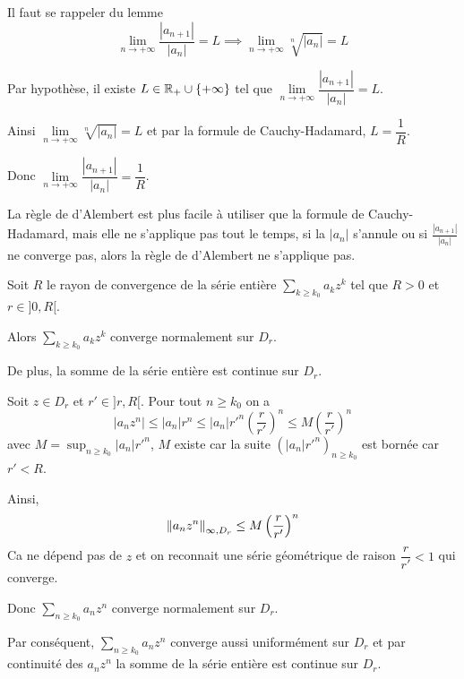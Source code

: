\documentclass[a4paper,12pt]{article}
\begin{document}
\begin{demonstration}
    Il faut se rappeler du lemme
    $$
    \lim_{n \to +\infty} \frac{|a_{n+1}|}{|a_n|} = L \implies \lim_{n \to +\infty} \sqrt[n]{|a_n|} = L
    $$

    Par hypothèse, il existe $L \in \mathbb{R}_+ \cup \{+\infty\}$ tel que $\lim\limits_{n \to +\infty} \dfrac{|a_{n+1}|}{|a_n|} = L$.

    Ainsi $\lim\limits_{n \to +\infty} \sqrt[n]{|a_n|} = L$ et par la formule de Cauchy-Hadamard, $L = \dfrac{1}{R}$.

    Donc $\lim\limits_{n \to +\infty} \dfrac{|a_{n+1}|}{|a_n|} = \dfrac{1}{R}$.
\end{demonstration}

\begin{remarque}
    La règle de d'Alembert est plus facile à utiliser que la formule de Cauchy-Hadamard,
    mais elle ne s'applique pas tout le temps, si la $|a_n|$ s'annule ou si $\frac{|a_{n+1}|}{|a_n|}$ ne converge pas,
    alors la règle de d'Alembert ne s'applique pas.    
\end{remarque}

\begin{proposition}{}{}
    Soit $R$ le rayon de convergence de la série entière $\sum\limits_{k \geq k_0} a_k z^k$ tel que $R > 0$ et $r \in ]0, R[$.

    \vspace{0.5cm}
    Alors $\sum\limits_{k \geq k_0} a_k z^k$ converge normalement sur $D_r$.

    De plus, la somme de la série entière est continue sur $D_r$.
\end{proposition}

\begin{demonstration}
    Soit $z \in D_r$ et $r' \in ]r, R[$.
    Pour tout $n \geq k_0$ on a
    $$
    |a_n z^n| \leq |a_n| r^n \leq |a_n| r'^n \left(\frac{r}{r'}\right)^n \leq M \left(\frac{r}{r'}\right)^n
    $$
    avec $M = \sup_{n \geq k_0} |a_n| r'^n$, $M$ existe car la suite $(|a_n| r'^n)_{n \geq k_0}$ est bornée car $r' < R$.
    
    Ainsi,
    $$
    \left\lVert a_n z^n\right\rVert_{\infty, D_r} \leq M \left(\frac{r}{r'}\right)^n
    $$
    Ca ne dépend pas de $z$ et on reconnait une série géométrique de raison $\dfrac{r}{r'} < 1$ qui converge.
    
    Donc $\sum\limits_{n \geq k_0} a_n z^n$ converge normalement sur $D_r$.

    Par conséquent, $\sum\limits_{n \geq k_0} a_n z^n$ converge aussi uniformément sur $D_r$
    et par continuité des $a_n z^n$ la somme de la série entière est continue sur $D_r$.
\end{demonstration}
\end{document}
